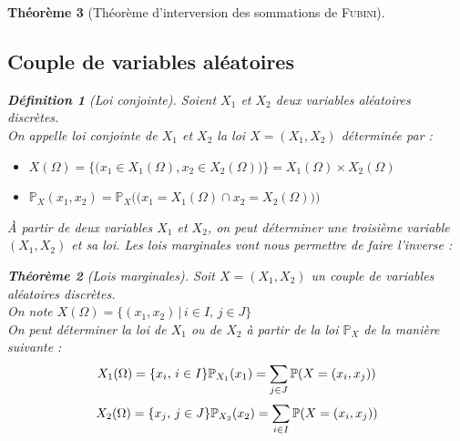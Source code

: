 \documentclass[11pt,a4paper]{report}
\newtheorem{theorem}{Théorème}[chapter]
\theoremstyle{definition}
\newtheorem{dfn}[theorem]{Définition}
\begin{document}
\begin{theorem}[Théorème d'interversion des sommations de \textsc{Fubini}]
{{\subsection{Couple de variables aléatoires} %
\label{sub:couple_de_variables_aleatoires}
\begin{dfn}[Loi conjointe]
     Soient $X_1$ et $X_2$ deux variables aléatoires discrètes. \\
     On appelle \emph{loi conjointe} de $X_1$ et $X_2$ la loi $X=(X_1,X_2)$ déterminée par :
     \begin{itemize}
         \item $X(\Omega ) = \bigg\lbrace \Big(x_1\in X_1(\Omega ), x_2\in X_2(\Omega )\Big)\bigg\rbrace = X_1(\Omega )\times X_2(\Omega )$
         \item $\mathbb{P}_X(x_1,x_2) = \mathbb{P}_X\bigg(\Big( x_1 = X_1(\Omega ) \cap x_2 = X_2(\Omega )\Big)\bigg)$
     \end{itemize}
\end{dfn}
À partir de deux variables $X_1$ et $X_2$, on peut déterminer une troisième variable $(X_1,X_2)$ et sa loi. Les lois marginales vont nous permettre de faire l'inverse :
\begin{theorem}[Lois marginales]
     Soit $X = (X_1 , X_2)$ un couple de variables aléatoires discrètes.\\
     On note $X(\Omega ) = \Big\lbrace (x_1, x_2)\, |\, i\in I,\, j\in J \Big\rbrace$ \\
     On peut déterminer la loi de $X_1$ ou de $X_2$ à partir de la loi $\mathbb{P}_X$ de la manière suivante : 
     \begin{equation}
     X_1(\Omega ) = \lbrace x_i ,\, i\in I\rbrace \\ \mathbb{P}_{X_1}(x_1) = \sum_{j\in J} \mathbb{P}(X = (x_i, x_j)) 
     \end{equation}
     \begin{equation}
     X_2(\Omega ) = \lbrace x_j ,\, j\in J\rbrace \\ \mathbb{P}_{X_2}(x_2) = \sum_{i\in I} \mathbb{P}(X = (x_i, x_j)) 
     \end{equation}
\end{theorem}

}}
\end{theorem}
\end{document}
